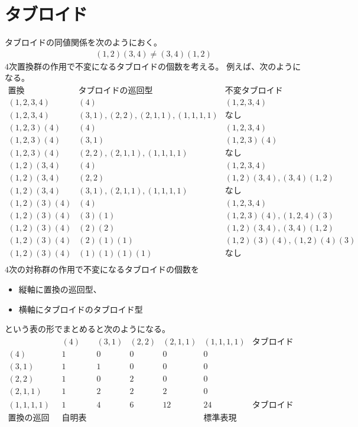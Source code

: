 \begingroup %
	\newcommand{\myid}{\myop{id}}
\section{タブロイド}\label{s1:タブロイド} %
	タブロイドの同値関係を次のようにおく。
	\begin{equation*}\begin{split} %
		(1,2)(3,4) \neq (3,4)(1,2)
	\end{split}\end{equation*} %
	$4$次置換群の作用で不変になるタブロイドの個数を考える。
	例えば、次のようになる。
	\begin{equation*}\begin{array}{rrr} %
		\text{置換} & \text{タブロイドの巡回型} & \text{不変タブロイド} \\
		(1,2,3,4) & (4) & (1,2,3,4) \\
		(1,2,3,4) & (3,1),(2,2),(2,1,1),(1,1,1,1) & \text{なし} \\
		(1,2,3)(4) & (4) & (1,2,3,4) \\
		(1,2,3)(4) & (3,1) & (1,2,3)(4) \\
		(1,2,3)(4) & (2,2),(2,1,1),(1,1,1,1) & \text{なし} \\
		(1,2)(3,4) & (4) & (1,2,3,4) \\
		(1,2)(3,4) & (2,2) & (1,2)(3,4),(3,4)(1,2) \\
		(1,2)(3,4) & (3,1),(2,1,1),(1,1,1,1) & \text{なし} \\
		(1,2)(3)(4) & (4) & (1,2,3,4) \\
		(1,2)(3)(4) & (3)(1) & (1,2,3)(4),(1,2,4)(3) \\
		(1,2)(3)(4) & (2)(2) & (1,2)(3,4),(3,4)(1,2) \\
		(1,2)(3)(4) & (2)(1)(1) & (1,2)(3)(4),(1,2)(4)(3) \\
		(1,2)(3)(4) & (1)(1)(1)(1) & \text{なし} \\
	\end{array}\end{equation*} %
	$4$次の対称群の作用で不変になるタブロイドの個数を
	\begin{itemize}\setlength{\itemsep}{-1mm} %
		\item 縦軸に置換の巡回型、
		\item 横軸にタブロイドのタブロイド型
	\end{itemize} %
	という表の形でまとめると次のようになる。
	\begin{equation*}\begin{array}{r|rrrrr|c}
		& (4) & (3,1) & (2,2) & (2,1,1) & (1,1,1,1) & \text{タブロイド型} \\ \hline
		(4) & 1 & 0 & 0 & 0 & 0 \\
		(3,1) & 1 & 1 & 0 & 0 & 0 \\
		(2,2) & 1 & 0 & 2 & 0 & 0 \\
		(2,1,1) & 1 & 2 & 2 & 2 & 0 \\
		(1,1,1,1) & 1 & 4 & 6 & 12 & 24 & \text{タブロイドの個数} \\ \hline
		\text{置換の巡回型} & \text{自明表現} &&&& \text{標準表現} \\
	\end{array}\end{equation*} %

